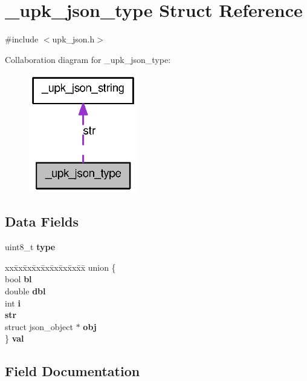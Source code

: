 \section{\_\-upk\_\-json\_\-type Struct Reference}
\label{struct__upk__json__type}


{\ttfamily \#include $<$upk\_\-json.h$>$}



Collaboration diagram for \_\-upk\_\-json\_\-type:\nopagebreak
\begin{figure}[H]
\begin{center}
\leavevmode
\includegraphics[width=134pt]{struct__upk__json__type__coll__graph}
\end{center}
\end{figure}
\subsection*{Data Fields}
\begin{DoxyCompactItemize}
\item 
uint8\_\-t {\bf type}
\item 
\begin{tabbing}
xx\=xx\=xx\=xx\=xx\=xx\=xx\=xx\=xx\=\kill
union \{\\
\>bool {\bf bl}\\
\>double {\bf dbl}\\
\>int {\bf i}\\
 {\bf str}\\
\>struct json\_object $\ast$ {\bf obj}\\
\} {\bf val}\\

\end{tabbing}\end{DoxyCompactItemize}


\subsection{Field Documentation}
